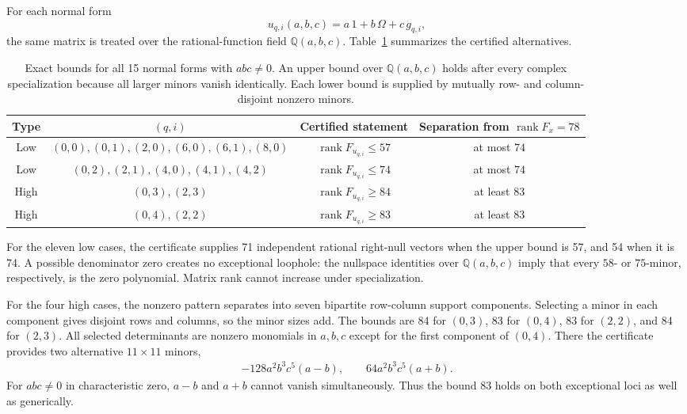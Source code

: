 \documentclass[aps,pra,reprint,groupedaddress,nofootinbib,longbibliography]{revtex4-2}
\newcommand{\rank}{\operatorname{rank}}
\begin{document}
For each normal form
\begin{equation}
 u_{q,i}(a,b,c)=a\,1+b\,\Omega+c\,g_{q,i},
 \label{eq:uqiform}
\end{equation}
the same matrix is treated over the rational-function field $\mathbb Q(a,b,c)$.
Table~\ref{tab:gap} summarizes the certified alternatives.

\begin{table}[t]
\caption{Exact bounds for all 15 normal forms with $abc\ne0$.  An upper bound
over $\mathbb Q(a,b,c)$ holds after every complex specialization because all
larger minors vanish identically.  Each lower bound is supplied by mutually
row- and column-disjoint nonzero minors.}
\label{tab:gap}
\begin{ruledtabular}
\begin{tabular}{c c c c}
Type & $(q,i)$ & Certified statement & Separation from $\rank F_x=78$\\
\hline
Low & $(0,0),(0,1),(2,0),(6,0),(6,1),(8,0)$ & $\rank F_{u_{q,i}}\le57$ & at most $74$\\
Low & $(0,2),(2,1),(4,0),(4,1),(4,2)$ & $\rank F_{u_{q,i}}\le74$ & at most $74$\\
High & $(0,3),(2,3)$ & $\rank F_{u_{q,i}}\ge84$ & at least $83$\\
High & $(0,4),(2,2)$ & $\rank F_{u_{q,i}}\ge83$ & at least $83$\\
\end{tabular}
\end{ruledtabular}
\end{table}

For the eleven low cases, the certificate supplies 71 independent rational
right-null vectors when the upper bound is 57, and 54 when it is 74.  A possible
denominator zero creates no exceptional loophole: the nullspace identities over
$\mathbb Q(a,b,c)$ imply that every $58$- or $75$-minor, respectively, is the
zero polynomial.  Matrix rank cannot increase under specialization.

For the four high cases, the nonzero pattern separates into seven bipartite
row-column support components.  Selecting a minor in each component gives
disjoint rows and columns, so the minor sizes add.  The bounds are 84 for
$(0,3)$, 83 for $(0,4)$, 83 for $(2,2)$, and 84 for $(2,3)$.  All selected
determinants are nonzero monomials in $a,b,c$ except for the first component of
$(0,4)$.  There the certificate provides two alternative $11\times11$ minors,
\begin{align}
 -128a^2b^3c^5(a-b),\qquad
  64a^2b^3c^5(a+b).
 \label{eq:exception-minors}
\end{align}
For $abc\ne0$ in characteristic zero, $a-b$ and $a+b$ cannot vanish
simultaneously.  Thus the bound 83 holds on both exceptional loci as well as
generically.
\end{document}
